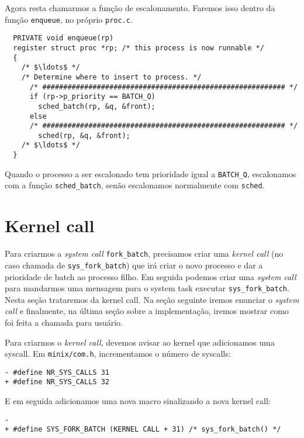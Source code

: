 \documentclass{amsart}
\theoremstyle{plain}
\newcommand{\code}[1]{\lstinline[mathescape=true]{#1}}
\begin{document}
Agora resta chamarmos a função de escalonamento. Faremos isso dentro da função \code{enqueue}, no
próprio \code{proc.c}.

\begin{verbatim}
  PRIVATE void enqueue(rp)
  register struct proc *rp; /* this process is now runnable */
  {
    /* $\ldots$ */
    /* Determine where to insert to process. */
      /* ########################################################## */
      if (rp->p_priority == BATCH_Q)
        sched_batch(rp, &q, &front);
      else
      /* ########################################################## */
        sched(rp, &q, &front);
    /* $\ldots$ */
  }
\end{verbatim}

Quando o processo a ser escalonado tem prioridade igual a \code{BATCH_Q}, escalonamos com a função
\code{sched_batch}, senão escalonamos normalmente com \code{sched}.

\section{Kernel call}

Para criarmos a \textit{system call} \code{fork_batch}, precisamos criar uma \textit{kernel call}
(no caso chamada de \code{sys_fork_batch}) que irá criar o novo processo e dar a prioridade de
batch ao processo filho. Em seguida podemos criar uma \textit{system call} para mandarmos uma
mensagem para o system task executar \code{sys_fork_batch}. Nesta seção trataremos da kernel call.
Na seção seguinte iremos enunciar o \textit{system call} e finalmente, na última seção sobre a
implementação, iremos mostrar como foi feita a chamada para usuário.

Para criarmos o \textit{kernel call}, devemos avisar ao kernel que adicionamos uma syscall. Em
\code{minix/com.h}, incrementamos o número de syscalls:

\begin{lstlisting}[frame=leftline,mathescape=true,style=nonumbers]
- #define NR_SYS_CALLS 31
+ #define NR_SYS_CALLS 32
\end{lstlisting}

E em seguida adicionamos uma nova macro sinalizando a nova kernel call:

\begin{lstlisting}[frame=leftline,mathescape=true,style=nonumbers]
-
+ #define SYS_FORK_BATCH (KERNEL CALL + 31) /* sys_fork_batch() */
\end{lstlisting}
\end{document}
